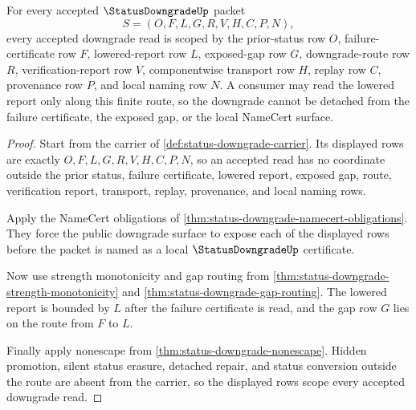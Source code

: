 \begin{theorem}
\label{thm:status-downgrade-scoped-gap-route}
For every accepted $\StatusDowngradeUp$ packet
$$
S=(O,F,L,G,R,V,H,C,P,N),
$$
every accepted downgrade read is scoped by the prior-status row $O$, failure-certificate row $F$, lowered-report row $L$, exposed-gap row $G$, downgrade-route row $R$, verification-report row $V$, componentwise transport row $H$, replay row $C$, provenance row $P$, and local naming row $N$. A consumer may read the lowered report only along this finite route, so the downgrade cannot be detached from the failure certificate, the exposed gap, or the local NameCert surface.
\end{theorem}
\begin{proof}
Start from the carrier of \autoref{def:status-downgrade-carrier}. Its displayed rows are exactly $O,F,L,G,R,V,H,C,P,N$, so an accepted read has no coordinate outside the prior status, failure certificate, lowered report, exposed gap, route, verification report, transport, replay, provenance, and local naming rows.

Apply the NameCert obligations of \autoref{thm:status-downgrade-namecert-obligations}. They force the public downgrade surface to expose each of the displayed rows before the packet is named as a local $\StatusDowngradeUp$ certificate.

Now use strength monotonicity and gap routing from \autoref{thm:status-downgrade-strength-monotonicity} and \autoref{thm:status-downgrade-gap-routing}. The lowered report is bounded by $L$ after the failure certificate is read, and the gap row $G$ lies on the route from $F$ to $L$.

Finally apply nonescape from \autoref{thm:status-downgrade-nonescape}. Hidden promotion, silent status erasure, detached repair, and status conversion outside the route are absent from the carrier, so the displayed rows scope every accepted downgrade read.
\end{proof}



